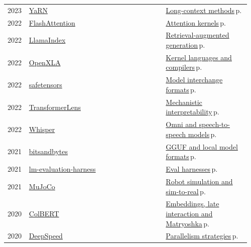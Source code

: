 \documentclass[10pt,a4paper,openany]{report}
\begin{document}
{\begin{longtable}{@{}p{0.07\linewidth}>{\raggedright}p{0.55\linewidth}>{\raggedright\arraybackslash}p{0.34\linewidth}@{}}
2023 & \href{https://github.com/jquesnelle/yarn}{YaRN} & \hyperref[c:arch-7]{Long-context methods}\,{\color{muted}\scriptsize p.\,\pageref{c:arch-7}}\\
2022 & \href{https://github.com/Dao-AILab/flash-attention}{FlashAttention} & \hyperref[c:inference-5]{Attention kernels}\,{\color{muted}\scriptsize p.\,\pageref{c:inference-5}}\\
2022 & \href{https://github.com/run-llama/llama_index}{LlamaIndex} & \hyperref[c:context-5]{Retrieval-augmented generation}\,{\color{muted}\scriptsize p.\,\pageref{c:context-5}}\\
2022 & \href{https://github.com/openxla/xla}{OpenXLA} & \hyperref[c:hardware-13]{Kernel languages and compilers}\,{\color{muted}\scriptsize p.\,\pageref{c:hardware-13}}\\
2022 & \href{https://github.com/huggingface/safetensors}{safetensors} & \hyperref[c:hardware-15]{Model interchange formats}\,{\color{muted}\scriptsize p.\,\pageref{c:hardware-15}}\\
2022 & \href{https://github.com/TransformerLensOrg/TransformerLens}{TransformerLens} & \hyperref[c:safety-6]{Mechanistic interpretability}\,{\color{muted}\scriptsize p.\,\pageref{c:safety-6}}\\
2022 & \href{https://github.com/openai/whisper}{Whisper} & \hyperref[c:vlm-7]{Omni and speech-to-speech models}\,{\color{muted}\scriptsize p.\,\pageref{c:vlm-7}}\\
2021 & \href{https://github.com/bitsandbytes-foundation/bitsandbytes}{bitsandbytes} & \hyperref[c:quant-5]{GGUF and local model formats}\,{\color{muted}\scriptsize p.\,\pageref{c:quant-5}}\\
2021 & \href{https://github.com/EleutherAI/lm-evaluation-harness}{lm-evaluation-harness} & \hyperref[c:evals-0]{Eval harnesses}\,{\color{muted}\scriptsize p.\,\pageref{c:evals-0}}\\
2021 & \href{https://github.com/google-deepmind/mujoco}{MuJoCo} & \hyperref[c:embodied-4]{Robot simulation and sim-to-real}\,{\color{muted}\scriptsize p.\,\pageref{c:embodied-4}}\\
2020 & \href{https://github.com/stanford-futuredata/ColBERT}{ColBERT} & \hyperref[c:context-8]{Embeddings, late interaction and Matryoshka}\,{\color{muted}\scriptsize p.\,\pageref{c:context-8}}\\
2020 & \href{https://github.com/deepspeedai/DeepSpeed}{DeepSpeed} & \hyperref[c:training-0]{Parallelism strategies}\,{\color{muted}\scriptsize p.\,\pageref{c:training-0}}\\

\end{longtable}}
\end{document}

